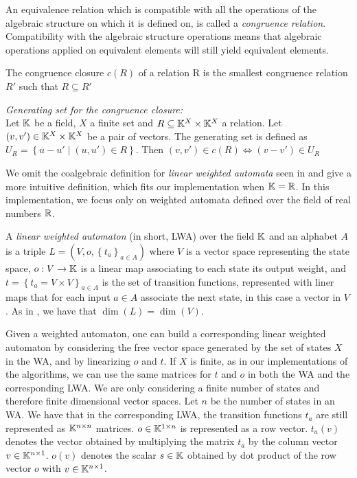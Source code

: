 An equivalence relation which is compatible with all the operations of
the algebraic structure on which it is defined on, is called a 
\textit{congruence relation}. Compatibility with the algebraic structure operations
means that algebraic operations applied on equivalent elements will still
yield equivalent elements. 

\begin{defn}
  The congruence closure $c(R)$ of a relation R is the smallest congruence relation 
  $R'$ such that $R \subseteq R'$ 
\end{defn}

\begin{defn}
  \label{def:congclos}
  \textit{Generating set for the congruence closure:} \\
  Let $\mathbb{K}$ be a field, $X$ a finite set and $R \subseteq \mathbb{K}^X \times \mathbb{K}^X$
  a relation. Let $(v, v') \in \mathbb{K}^X \times \mathbb{K}^X$ be a pair of vectors.
  The generating set is defined as  $U_R = \left\lbrace u - u' \mid (u, u') \in R \right\rbrace$.
  Then $(v, v') \in c(R) \iff (v - v') \in U_R$
\end{defn}




We omit the coalgebraic definition for \textit{linear weighted automata} seen in 
\cite{BONCHI201277} and give a more intuitive definition, which fits our  
implementation when $\mathbb{K} = \mathbb{R}$.
In this implementation, we focus only on weighted automata defined over 
the field of real numbers $\mathbb{R}$. 

\begin{defn}
  A \textit{linear weighted automaton} (in short, LWA) over the field $\mathbb{K}$ and 
  an alphabet $A$
  is a triple  $L = (V, o, \left\lbrace t_a \right\rbrace_{a \in A})$ 
  where $V$ is a vector space representing the state space, 
  $o: V \to \mathbb{K}$ is a linear map associating to each state its output weight,
  and $t = \left\lbrace t_a = V \times V \right\rbrace_{a \in A}$ is
  the set of transition functions, represented with liner maps 
  that for each input $a \in A$ associate the next state, in this case a vector
  in $V$.
  As in \cite{boreale2009weighted}, we have that $\dim{(L)} = \dim{(V)}$.
\end{defn}

Given a weighted automaton, one can build a corresponding linear weighted automaton
by considering the free vector space generated by the set of states $X$ in the WA,
and by linearizing $o$ and $t$. If $X$ is finite, as in our implementations
of the algorithms, we can use the same matrices for 
$t$ and $o$ in both the WA and the corresponding LWA.
We are only considering a finite number of states and therefore finite dimensional
vector spaces. Let $n$ be the number of states in an WA.
We have that in the corresponding LWA, the transition functions $t_a$ are still
 represented as
$\mathbb{K}^{n \times n}$ matrices. $o \in \mathbb{K}^{1 \times n}$ is represented as a row vector.
$t_a(v)$ denotes the vector obtained by multiplying the matrix $t_a$ by the column 
vector $v  \in \mathbb{K}^{n \times 1}$. $o(v)$ denotes the scalar $s \in \mathbb{K}$ obtained by 
dot product of the row vector $o$ with $v \in \mathbb{K}^{n \times 1}$.


